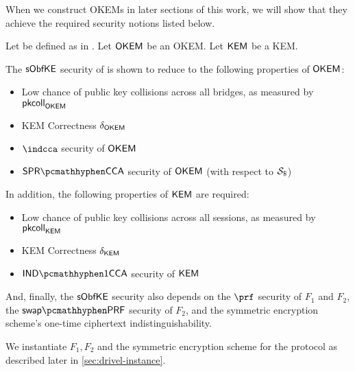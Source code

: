 When we construct OKEMs in later sections of this work, we will show that they achieve the required security notions listed below.

\begin{theorem}
\label{thm:drivel-security}
    Let \drivel{} be defined as in \cite[Fig.~6]{EPRINT:GRSV25}. Let $\mathsf{OKEM}$ be an OKEM. Let $\mathsf{KEM}$ be a KEM.
    
    The $\mathsf{sObfKE}$ security of \drivel{} is shown to reduce to the following properties of $\mathsf{OKEM}$:
    \begin{itemize}
        \item Low chance of public key collisions across all bridges, as measured by $\mathsf{pkcoll}_{\mathsf{OKEM}}$
        \item KEM Correctness $\delta_{\mathsf{OKEM}}$
        \item $\indcca$ security of $\mathsf{OKEM}$
        \item $\sprcca$ security of $\mathsf{OKEM}$ (with respect to $\simulbin$)
    \end{itemize}

    In addition, the following properties of $\mathsf{KEM}$ are required:
    \begin{itemize}
        \item Low chance of public key collisions across all sessions, as measured by $\mathsf{pkcoll}_{\mathsf{KEM}}$
        \item KEM Correctness $\delta_{\mathsf{KEM}}$
        \item $\indonecca$ security of $\mathsf{KEM}$
    \end{itemize}

    And, finally, the $\mathsf{sObfKE}$ security also depends on the $\prf$ security of $F_1$ and $F_2$, the $\swapprf$ security of $F_2$, and the symmetric encryption scheme's one-time ciphertext indistinguishability.
\end{theorem}

We instantiate $F_1,F_2$ and the symmetric encryption scheme for the \drivel{} protocol as described later in \cref{sec:drivel-instance}.

